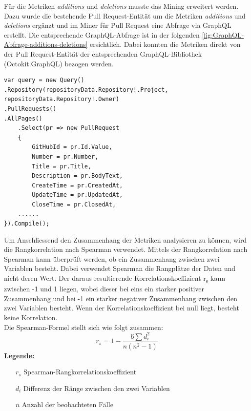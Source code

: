 Für die Metriken \textit{additions} und \textit{deletions} musste das Mining erweitert werden. Dazu wurde die bestehende Pull Request-Entität um die Metriken \textit{additions} und \textit{deletions} ergänzt und im Miner für Pull Request eine Abfrage via GraphQL erstellt. Die entsprechende GraphQL-Abfrage ist in der folgenden \autoref{fig:GraphQL-Abfrage-additions-deletions} ersichtlich. Dabei konnten die Metriken direkt von der Pull Request-Entität der entsprechenden GraphQL-Bibliothek (Octokit.GraphQL) bezogen werden.

\begin{lstlisting}[language=CSharp, caption={GraphQL-Abfrage additions und deletions}]
var query = new Query()
.Repository(repositoryData.Repository!.Project, repositoryData.Repository!.Owner)
.PullRequests()
.AllPages()
    .Select(pr => new PullRequest
    {
        GitHubId = pr.Id.Value,
        Number = pr.Number,
        Title = pr.Title,
        Description = pr.BodyText,
        CreateTime = pr.CreatedAt,
        UpdateTime = pr.UpdatedAt,
        CloseTime = pr.ClosedAt,
    ......
}).Compile();
\end{lstlisting}

Um Anschliessend den Zusammenhang der Metriken analysieren zu können, wird die Rangkorrelation nach Spearman verwendet. Mittels der Rangkorrelation nach Spearman \parencite{noauthor_t-test_nodate} kann überprüft werden, ob ein Zusammenhang zwischen zwei Variablen besteht. Dabei verwendet Spearman die Rangplätze der Daten und nicht deren Wert. Der daraus resultierende Korrelationskoeffizient r\textsubscript{s} kann zwischen -1 und 1 liegen, wobei dieser bei eins ein starker positiver Zusammenhang und bei -1 ein starker negativer Zusammenhang zwischen den zwei Variablen besteht. Wenn der Korrelationskoeffizient bei null liegt, besteht keine Korrelation. \parencite{noauthor_t-test_nodate}  \\
Die Spearman-Formel \parencite{noauthor_t-test_nodate} stellt sich wie folgt zusammen: 
\begin{equation}
r_s = 1 - \frac{6 \sum d_i^2}{n(n^2 - 1)}
\end{equation}
\label{eqn:spearman}
\noindent\textbf{Legende:}
\begin{itemize}
  \item [$r_s$] Spearman-Rangkorrelationskoeffizient
  \item[$d_i$] Differenz der Ränge zwischen den zwei Variablen 
  \item[$n$] Anzahl der beobachteten Fälle
\end{itemize}

